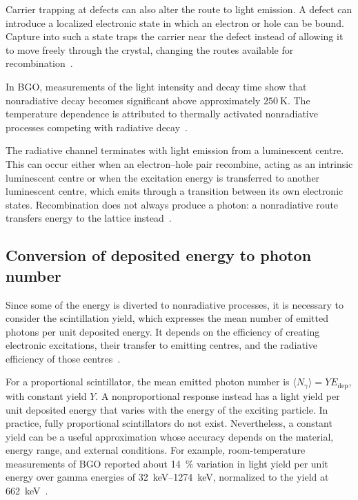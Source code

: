 Carrier trapping at defects can also alter the route to light emission.
A defect can introduce a localized electronic state in which an electron or hole can be bound. Capture into such a state traps the carrier near the defect instead of allowing it to move freely through the crystal, changing the routes available for recombination~\parencite{vanginhoven2013defects}.

In BGO, measurements of the light intensity and decay time show that nonradiative decay becomes significant above approximately $\qty{250}{\kelvin}$. The temperature dependence is attributed to thermally activated nonradiative processes competing with radiative decay~\parencite{gironnet2008bgo}.

The radiative channel terminates with light emission from a luminescent centre. This can occur either when an electron--hole pair recombine, acting as an intrinsic luminescent centre or when the excitation energy is transferred to another luminescent centre, which emits through a transition between its own electronic states. Recombination does not always produce a photon: a nonradiative route transfers energy to the lattice instead~\parencite{pedrini2005scintillation}.

\subsection{Conversion of deposited energy to photon number}

Since some of the energy is diverted to nonradiative processes, it is necessary to consider the scintillation yield, which expresses the mean number of emitted photons per unit deposited energy. It depends on the efficiency of creating electronic excitations, their transfer to emitting centres, and the radiative efficiency of those centres~\parencite{pedrini2005scintillation}.

For a proportional scintillator, the mean emitted photon number is $\langle N_\gamma\rangle=Y E_{\mathrm{dep}}$, with constant yield $Y$. A nonproportional response instead has a light yield per unit deposited energy that varies with the energy of the exciting particle. In practice, fully proportional scintillators do not exist. Nevertheless, a constant yield can be a useful approximation whose accuracy depends on the material, energy range, and external conditions. For example, room-temperature measurements of BGO reported about \qty{14}{\percent} variation in light yield per unit energy over gamma energies of \qtyrange{32}{1274}{\kilo\electronvolt}, normalized to the yield at \qty{662}{\kilo\electronvolt}~\parencite{sreebunpeng2012comparison}.

